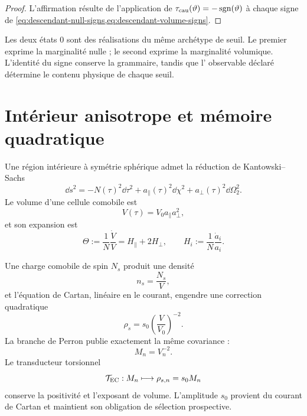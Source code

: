 \begin{proof}
L'affirmation résulte de l'application de
\(\tau_{\rm cau}(\vartheta)=-\operatorname{sgn}(\vartheta)\) à chaque signe de
\cref{eq:descendant-null-signs,eq:descendant-volume-signs}.
\end{proof}

Les deux états \(0\) sont des réalisations du même archétype de seuil. Le
premier exprime la marginalité nulle ; le second exprime la marginalité
volumique. L'identité du signe conserve la grammaire, tandis que l'
observable déclaré détermine le contenu physique de chaque seuil.

\section{Intérieur anisotrope et mémoire quadratique}

Une région intérieure à symétrie sphérique admet la réduction de
Kantowski--Sachs
\begin{equation}
 \dd s^2=-N(\tau)^2\dd\tau^2
 +a_\parallel(\tau)^2\dd\chi^2
 +a_\perp(\tau)^2\dd\Omega_2^2.
 \label{eq:descendant-KS-metric}
\end{equation}
Le volume d'une cellule comobile est
\begin{equation}
 V(\tau)=V_0a_\parallel a_\perp^2,
 \label{eq:descendant-KS-volume}
\end{equation}
et son expansion est
\begin{equation}
 \Theta
 :=\frac1N\frac{\dot V}{V}
 =H_\parallel+2H_\perp,
 \qquad
 H_i:=\frac1N\frac{\dot a_i}{a_i}.
 \label{eq:descendant-KS-expansion}
\end{equation}

Une charge comobile de spin \(N_s\) produit une densité
\begin{equation}
 n_s=\frac{N_s}{V},
 \label{eq:descendant-spin-number-density}
\end{equation}
et l'équation de Cartan, linéaire en le courant, engendre une correction
quadratique
\begin{equation}
 \rho_s=s_0\left(\frac V{V_0}\right)^{-2}.
 \label{eq:descendant-spin-density}
\end{equation}
La branche de Perron publie exactement la même covariance :
\begin{equation}
 M_n=V_n^{-2}.
 \label{eq:descendant-Perron-volume}
\end{equation}
Le transducteur torsionnel
\begin{equation}
 \mathcal T_{\rm EC}:M_n\longmapsto
 \rho_{s,n}=s_0M_n
 \label{eq:descendant-EC-transducer}
\end{equation}
conserve la positivité et l'exposant de volume. L'amplitude \(s_0\) provient
du courant de Cartan et maintient son obligation de sélection
prospective.


